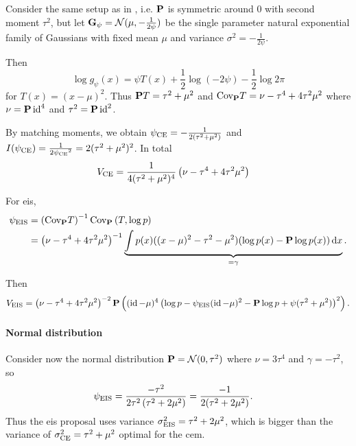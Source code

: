 \begin{example}
    \label{ex:univ-gaussian-mu-fixed}
    Consider the same setup as in , i.e. $\P$ is symmetric around $0$ with second moment $\tau^{2}$, but let $\G_{\psi} = \mathcal N(\mu, -\frac{1}{2\psi})$ be the single parameter natural exponential family of Gaussians with fixed mean $\mu$ and variance $\sigma^{2} = -\frac{1}{2 \psi}$. 
    
    Then
    $$
    \log g_{\psi}(x) = \psi T(x) + \frac{1}{2}\log \left( - 2 \psi \right) - \frac{1}{2} \log 2\pi
    $$
    for $T(x) = (x - \mu)^{2}$. Thus $\P T = \tau^{2} + \mu^{2}$ and $\cov_{\P} T = \nu - \tau^{4} + 4\tau^{2}\mu^{2}$ where $\nu = \P \operatorname{id}^{4}$ and $\tau^{2} = \P \id^{2}$. 

    By matching moments, we obtain $\pce = -\frac{1}{2(\tau^{2} + \mu^{2})}$ and $I(\pce) = \frac{1}{2\pce^{2}} = 2(\tau^{2} + \mu^{2})^{2}$. In total 
    \begin{align}
        V_{\ce} &= \frac{1}{4 (\tau^{2} + \mu^{2})^{4}} \left( \nu - \tau^{4} + 4\tau^{2}\mu^{2} \right)
    \end{align}

    For \gls{eis},
    \begin{align*}
    \peis &= \left( \cov_{\P} T \right)^{-1} \cov_{\P} \left( T, \log p \right) \\
        &= \left( \nu - \tau^{4} + 4\tau^{2}\mu^{2} \right)^{-1} \underbrace{\int p(x)((x-\mu)^{2}-\tau^{2} - \mu^{2})(\log p(x) - \P\log p(x)) \d x}_{=\gamma}.
    \end{align*}
    
    Then 
    \begin{align*}
        V_{\eis} = \left( \nu - \tau^{4} + 4 \tau^{2}\mu^{2}\right)^{-2} \P \left( (\id - \mu)^{4} \left( \log p - \peis (\id - \mu)^{2} - \P \log p + \psi (\tau^{2} + \mu^{2}) \right)^{2} \right).
    \end{align*}

    \paragraph{Normal distribution}
    Consider now the normal distribution $\P = \mathcal N (0, \tau^{2})$ where $\nu = 3 \tau^{4}$ and $\gamma = -\tau^{2}$, so 
    \begin{align*}
        \peis &= \frac{-\tau^{2}}{2\tau^{2} \left( \tau^{2} + 2\mu^{2} \right)} = \frac{-1}{2(\tau^{2} + 2\mu^{2})}.
    \end{align*}
    Thus the \gls{eis} proposal uses variance $\sigma^{2}_{\eis} = \tau^{2} + 2\mu^{2}$, which is bigger than the variance of $\sigma^{2}_{\ce} = \tau^{2} + \mu^{2}$ optimal for the \gls{cem}.


\end{example}

